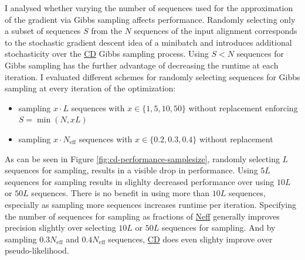 \documentclass[11pt,a4paper,twoside]{book}
\providecommand{\tightlist}{%
  \setlength{\itemsep}{0pt}\setlength{\parskip}{0pt}}
\newcommand{\eq}{\!=\!}
\theoremstyle{definition}
\theoremstyle{definition}
\theoremstyle{remark}
\begin{document}
I analysed whether varying the number of sequences used for the
approximation of the gradient via Gibbs sampling affects performance.
Randomly selecting only a subset of sequences \(S\) from the \(N\)
sequences of the input alignment corresponds to the stochastic gradient
descent idea of a minibatch and introduces additional stochasticity over
the \protect\hyperlink{abbrev}{CD} Gibbs sampling process. Using
\(S < N\) sequences for Gibbs sampling has the further advantage of
decreasing the runtime at each iteration. I evaluated different schemes
for randomly selecting sequences for Gibbs sampling at every iteration
of the optimization:

\begin{itemize}
\tightlist
\item
  sampling \(x \cdot L\) sequences with \(x \in \{ 1, 5, 10, 50 \}\)
  without replacement enforcing \(S \eq \min(N, xL)\)
\item
  sampling \(x \cdot N_{\textrm{eff}}\) sequences with
  \(x \in \{ 0.2, 0.3, 0.4 \}\) without replacement
\end{itemize}

As can be seen in Figure \ref{fig:cd-performance-samplesize}, randomly
selecting \(L\) sequences for sampling, results in a visible drop in
performance. Using \(5L\) sequences for sampling results in slighlty
decreased performance over using \(10L\) or \(50L\) sequences. There is
no benefit in using more than \(10L\) sequences, especially as sampling
more sequences increases runtime per iteration. Specifying the number of
sequences for sampling as fractions of \protect\hyperlink{abbrev}{Neff}
generally improves precision slightly over selecting \(10L\) or \(50L\)
sequences for sampling. And by sampling \(0.3N_{\textrm{eff}}\) and
\(0.4N_{\textrm{eff}}\) sequences, \protect\hyperlink{abbrev}{CD} does
even slighty improve over pseudo-likelihood.
\end{document}

